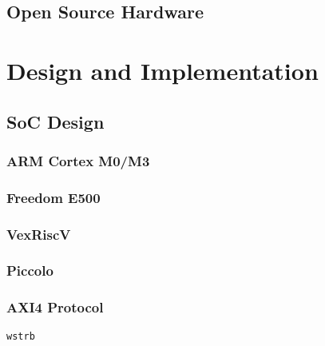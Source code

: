 \documentclass[a4paper,9pt]{report}
\begin{document}
\section{Open Source Hardware}
\section{}


\chapter{Design and Implementation}





%




\section{SoC Design}
\subsection{ARM Cortex M0/M3}
\subsection{Freedom E500}
\subsection{VexRiscV}
\subsection{Piccolo}

\subsection{AXI4 Protocol}
\texttt{wstrb}
\end{document}
